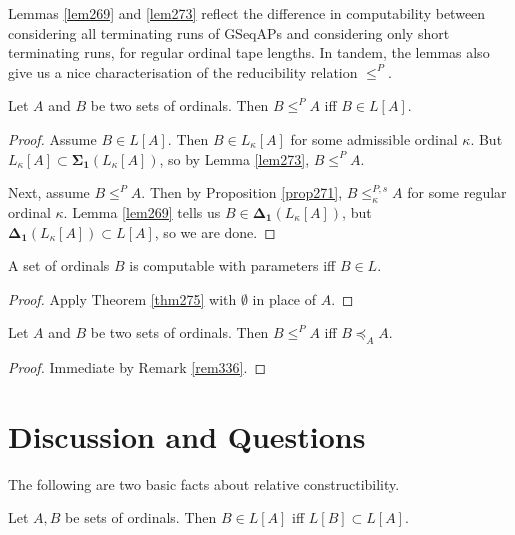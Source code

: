 \documentclass[12pt]{article}
\numberwithin{equation}{section}
\begin{document}
Lemmas \ref{lem269} and \ref{lem273} reflect the difference in computability between considering all terminating runs of GSeqAPs and considering only short terminating runs, for regular ordinal tape lengths. In tandem, the lemmas also give us a nice characterisation of the reducibility relation $\leq^P$.

\begin{thm}\label{thm275}
Let $A$ and $B$ be two sets of ordinals. Then $B \leq^P A$ iff $B \in L[A]$.
\end{thm}

\begin{proof}
Assume $B \in L[A]$. Then $B \in L_{\kappa}[A]$ for some admissible ordinal $\kappa$. But $L_{\kappa}[A] \subset \mathbf{\Sigma_1}(L_{\kappa}[A])$, so by Lemma \ref{lem273}, $B \leq^P A$. 

Next, assume $B \leq^P A$. Then by Proposition \ref{prop271}, $B \leq^{P, s}_{\kappa} A$ for some regular ordinal $\kappa$. Lemma \ref{lem269} tells us $B \in \mathbf{\Delta_1}(L_{\kappa}[A])$, but $\mathbf{\Delta_1}(L_{\kappa}[A]) \subset L[A]$, so we are done.
\end{proof}

\begin{cor}
A set of ordinals $B$ is computable with parameters iff $B \in L$.
\end{cor}

\begin{proof}
Apply Theorem \ref{thm275} with $\emptyset$ in place of $A$. 
\end{proof}

\begin{cor}
Let $A$ and $B$ be two sets of ordinals. Then $B \leq^P A$ iff $B \preceq_A A$.
\end{cor}

\begin{proof}
Immediate by Remark \ref{rem336}.
\end{proof}

\section{Discussion and Questions}

The following are two basic facts about relative constructibility.

\begin{fact}\label{fact276}
Let $A, B$ be sets of ordinals. Then $B \in L[A]$ iff $L[B] \subset L[A]$.
\end{fact}
\end{document}
